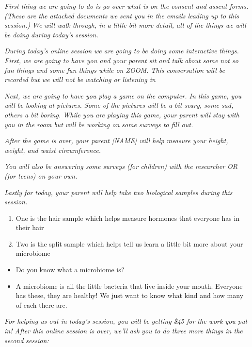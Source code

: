 \documentclass[
]{book}
\providecommand{\tightlist}{%
  \setlength{\itemsep}{0pt}\setlength{\parskip}{0pt}}
\begin{document}
\emph{First thing we are going to do is go over what is on the consent and assent forms. (These are the attached documents we sent you in the emails leading up to this session.) We will walk through, in a little bit more detail, all of the things we will be doing during today's session.}

\emph{During today's online session we are going to be doing some interactive things. First, we are going to have you and your parent sit and talk about some not so fun things and some fun things while on ZOOM. This conversation will be recorded but we will not be watching or listening in}

\emph{Next, we are going to have you play a game on the computer. In this game, you will be looking at pictures. Some of the pictures will be a bit scary, some sad, others a bit boring. While you are playing this game, your parent will stay with you in the room but will be working on some surveys to fill out.}

\emph{After the game is over, your parent {[}NAME{]} will help measure your height, weight, and waist circumference.}

\emph{You will also be answering some surveys (for children) with the researcher OR (for teens) on your own.}

\emph{Lastly for today, your parent will help take two biological samples during this session.}

\begin{enumerate}
\def\labelenumi{\arabic{enumi}.}
\tightlist
\item
  One is the hair sample which helps measure hormones that everyone has in their hair
\item
  Two is the split sample which helps tell us learn a little bit more about your microbiome
\end{enumerate}

\begin{itemize}
\tightlist
\item
  Do you know what a microbiome is?
\item
  A microbiome is all the little bacteria that live inside your mouth. Everyone has these, they are healthy! We just want to know what kind and how many of each there are.
\end{itemize}

\emph{For helping us out in today's session, you will be getting \$45 for the work you put in! After this online session is over, we'll ask you to do three more things in the second session:}
\end{document}
